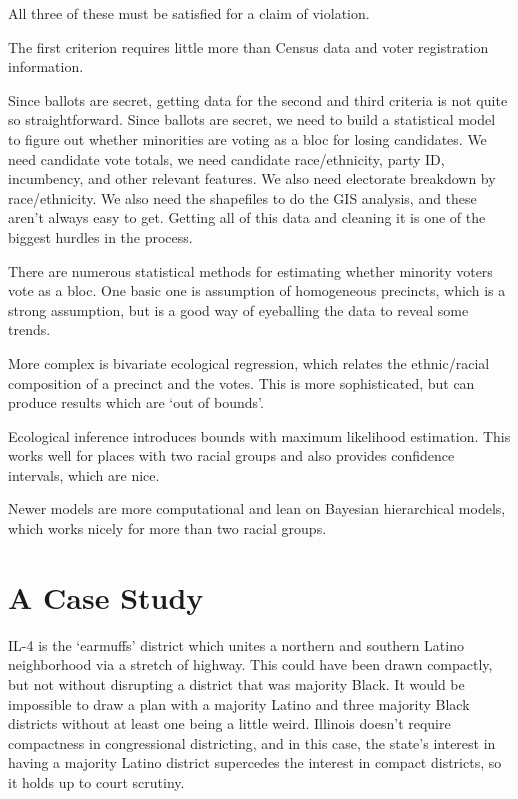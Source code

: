 All three of these must be satisfied for a claim of violation.

The first criterion requires little more than Census data and voter registration information.

Since ballots are secret, getting data for the second and third criteria is not quite so straightforward.  Since ballots are secret, we need to build a statistical model to figure out whether minorities are voting as a bloc for losing candidates.  We need candidate vote totals, we need candidate race/ethnicity, party ID, incumbency, and other relevant features.  We also need electorate breakdown by race/ethnicity.  We also need the shapefiles to do the GIS analysis, and these aren't always easy to get.  Getting all of this data and cleaning it is one of the biggest hurdles in the process.

There are numerous statistical methods for estimating whether minority voters vote as a bloc. One basic one is assumption of homogeneous precincts, which is a strong assumption, but is a good way of eyeballing the data to reveal some trends.

More complex is bivariate ecological regression, which relates the ethnic/racial composition of a precinct and the votes.  This is more sophisticated, but can produce results which are `out of bounds'.

Ecological inference introduces bounds with maximum likelihood estimation.  This works well for places with two racial groups and also provides confidence intervals, which are nice.

Newer models are more computational and lean on Bayesian hierarchical models, which works nicely for more than two racial groups.

\section*{A Case Study}

IL-4 is the `earmuffs' district which unites a northern and southern Latino neighborhood via a stretch of highway.  This could have been drawn compactly, but not without disrupting a district that was majority Black.  It would be impossible to draw a plan with a majority Latino and three majority Black districts without at least one being a little weird.  Illinois doesn't require compactness in congressional districting, and in this case, the state's interest in having a majority Latino district supercedes the interest in compact districts, so it holds up to court scrutiny.